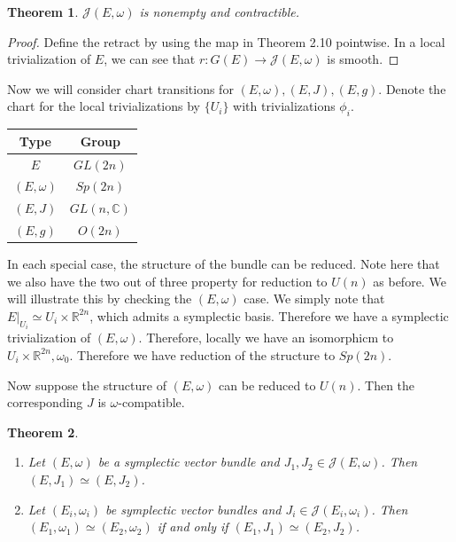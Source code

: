 \documentclass[leqno, openany]{memoir}
\newtheorem{thm}{Theorem}[chapter]
\theoremstyle{definition}
\theoremstyle{remark}
\theoremstyle{plain}
\theoremstyle{definition}
\theoremstyle{remark}
\newcommand{\R}{\mathbb{R}}
\newcommand{\C}{\mathbb{C}}
\newcommand{\mc}[1]{\mathcal{#1}}
\begin{document}
\begin{thm}
    $\mc{J}(E, \omega)$ is nonempty and contractible.
\end{thm}

\begin{proof}
    Define the retract by using the map in Theorem 2.10 pointwise. In a local trivialization of $E$, we can see that $r: G(E) \to \mc{J}(E, \omega)$ is smooth.
\end{proof}

Now we will consider chart transitions for $(E, \omega), (E, J), (E, g)$. Denote the chart for the local trivializations by $\{U_i\}$ with trivializations $\phi_i$.
\begin{center}
    \begin{tabular}{cc}
        \toprule
        Type & Group \\
        \midrule
        $E$ & $GL(2n)$ \\
        $(E,\omega)$ & $Sp(2n)$ \\
        $(E,J)$ & $GL(n, \C)$ \\
        $(E,g)$ & $O(2n)$ \\
        \bottomrule
    \end{tabular}
\end{center}
In each special case, the structure of the bundle can be reduced. Note here that we also have the two out of three property for reduction to $U(n)$ as before. We will illustrate this by checking the $(E, \omega)$ case. We simply note that $E|_{U_i} \simeq U_i \times \R^{2n}$, which admits a symplectic basis. Therefore we have a symplectic trivialization of $(E, \omega)$. Therefore, locally we have an isomorphicm to $U_i \times \R^{2n}, \omega_0$. Therefore we have reduction of the structure to $Sp(2n)$.

Now suppose the structure of $(E, \omega)$ can be reduced to $U(n)$. Then the corresponding $J$ is $\omega$-compatible.

\begin{thm}
    \begin{enumerate}
        \item Let $(E, \omega)$ be a symplectic vector bundle and $J_1, J_2 \in \mc{J}(E, \omega)$. Then $(E, J_1) \simeq (E, J_2)$.
        \item Let $(E_i, \omega_i)$ be symplectic vector bundles and $J_i \in \mc{J}(E_i, \omega_i)$. Then $(E_1, \omega_1) \simeq (E_2, \omega_2)$ if and only if $(E_1, J_1) \simeq (E_2, J_2)$.
    \end{enumerate}
\end{thm}
\end{document}
